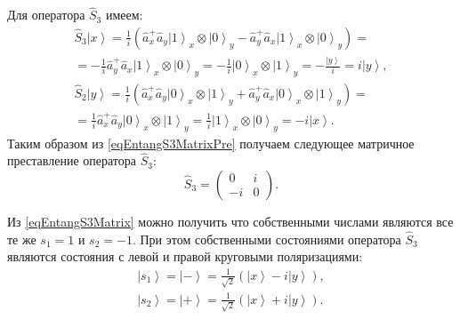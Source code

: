Для оператора $\hat{S}_3$ имеем:
\begin{eqnarray}
  \hat{S}_3 \left|x\right> = \frac{1}{i}\left(\hat{a}_x^{+} \hat{a}_y
\left|1\right>_x\otimes\left|0\right>_y - \hat{a}_y^{+}
\hat{a}_x\left|1\right>_x\otimes\left|0\right>_y\right) =
\nonumber \\
= 
-\frac{1}{i}\hat{a}_y^{+}
\hat{a}_x\left|1\right>_x\otimes\left|0\right>_y =
-\frac{1}{i}\left|0\right>_x\otimes\left|1\right>_y =
-\frac{\left|y\right>}{i} = i \left|y\right>,
\nonumber \\
\hat{S}_2 \left|y\right> = \frac{1}{i}\left(\hat{a}_x^{+} \hat{a}_y
\left|0\right>_x\otimes\left|1\right>_y + \hat{a}_y^{+}
\hat{a}_x\left|0\right>_x\otimes\left|1\right>_y\right) =
\nonumber \\
=
\frac{1}{i}\hat{a}_x^{+} \hat{a}_y
\left|0\right>_x\otimes\left|1\right>_y
=\frac{1}{i}\left|1\right>_x\otimes\left|0\right>_y =
-i \left|x\right>.
\label{eqEntangS3MatrixPre}
\end{eqnarray}
Таким образом из \eqref{eqEntangS3MatrixPre} получаем следующее
матричное преставление оператора $\hat{S}_3$:
\begin{equation}
\hat{S}_3 = 
\left(
\begin{array}{cc}
0 & i \\
-i & 0 
\end{array}
\right).
\label{eqEntangS3Matrix}
\end{equation}


Из \eqref{eqEntangS3Matrix} можно получить что собственными числами
являются все те же $s_1 = 1$ и $s_2 = -1$. При этом собственными
состояниями оператора $\hat{S}_3$ являются состояния с левой и правой
круговыми поляризациями:
\begin{eqnarray}
  \left| s_1 \right> = \left| - \right> = \frac{1}{\sqrt{2}}
  \left(
  \left|x\right> - i \left|y\right>
  \right),
  \nonumber \\
  \left| s_2 \right> = \left| + \right> = \frac{1}{\sqrt{2}}
  \left(
  \left|x\right> + i \left|y\right>
  \right).
  \label{eqEntangS3Eigenvec}
\end{eqnarray}


